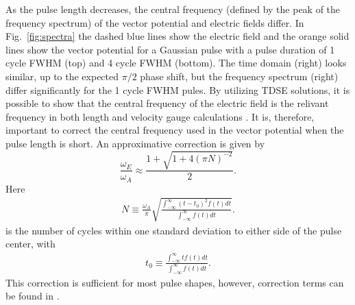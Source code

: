 As the pulse length decreases, the central frequency (defined by the peak of the frequency spectrum) of the vector potential and electric fields differ. In Fig.~\ref{fig:spectra} the dashed blue lines show the electric field and the orange solid lines show the vector potential for a Gaussian pulse with a pulse duration of 1 cycle FWHM (top) and 4 cycle FWHM (bottom). The time domain (right) looks similar, up to the expected $\pi/2$ phase shift, but the frequency spectrum (right) differ significantly for the 1 cycle FWHM pules. By utilizing TDSE solutions, it is possible to show that the central frequency of the electric field is the relivant frequency in both length and velocity gauge calculations \cite{venzke_central_2018}. It is, therefore, important to correct the central frequency used in the vector potential when the pulse length is short. An approximative correction is given by
\begin{equation}
\label{eq:fshift}
\frac{\omega_E}{\omega_A} 
\approx
\frac{1+\sqrt{1+4(\pi N)^{-2}}}{2}.
\end{equation}
%
Here
%
\begin{equation}
\begin{split}
\label{eq:nbar}
 N \equiv \frac{\omega_A}{\pi} \sqrt{\frac{\int_{-\infty}^{\infty} (t-t_0)^2 f(t) dt}{\int_{-\infty}^{\infty} f(t) dt}}.
\end{split}
\end{equation}
%
is the number of cycles within one standard deviation to either side of the pulse center, with
%
\begin{equation}
\begin{split}
t_0 \equiv \frac{\int_{-\infty}^{\infty} t f(t) dt}{\int_{-\infty}^{\infty} f(t) dt}.
\end{split}
\end{equation}
This correction is sufficient for most pulse shapes, however, correction terms can be found in \cite{venzke_central_2018}.



